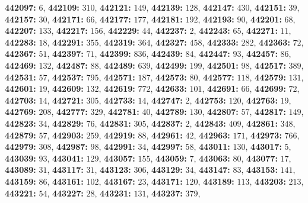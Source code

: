 \textsf{\bfseries 442097:} $6$, \textsf{\bfseries 442109:} $310$, \textsf{\bfseries 442121:} $149$, \textsf{\bfseries 442139:} $128$, \textsf{\bfseries 442147:} $430$, \textsf{\bfseries 442151:} $39$, \textsf{\bfseries 442157:} $30$, \textsf{\bfseries 442171:} $66$, \textsf{\bfseries 442177:} $177$, \textsf{\bfseries 442181:} $192$, \textsf{\bfseries 442193:} $90$, \textsf{\bfseries 442201:} $68$, \textsf{\bfseries 442207:} $133$, \textsf{\bfseries 442217:} $156$, \textsf{\bfseries 442229:} $44$, \textsf{\bfseries 442237:} $2$, \textsf{\bfseries 442243:} $65$, \textsf{\bfseries 442271:} $11$, \textsf{\bfseries 442283:} $18$, \textsf{\bfseries 442291:} $355$, \textsf{\bfseries 442319:} $364$, \textsf{\bfseries 442327:} $458$, \textsf{\bfseries 442333:} $282$, \textsf{\bfseries 442363:} $72$, \textsf{\bfseries 442367:} $51$, \textsf{\bfseries 442397:} $71$, \textsf{\bfseries 442399:} $836$, \textsf{\bfseries 442439:} $84$, \textsf{\bfseries 442447:} $93$, \textsf{\bfseries 442457:} $86$, \textsf{\bfseries 442469:} $132$, \textsf{\bfseries 442487:} $88$, \textsf{\bfseries 442489:} $639$, \textsf{\bfseries 442499:} $199$, \textsf{\bfseries 442501:} $98$, \textsf{\bfseries 442517:} $389$, \textsf{\bfseries 442531:} $57$, \textsf{\bfseries 442537:} $795$, \textsf{\bfseries 442571:} $187$, \textsf{\bfseries 442573:} $80$, \textsf{\bfseries 442577:} $118$, \textsf{\bfseries 442579:} $131$, \textsf{\bfseries 442601:} $19$, \textsf{\bfseries 442609:} $132$, \textsf{\bfseries 442619:} $772$, \textsf{\bfseries 442633:} $101$, \textsf{\bfseries 442691:} $66$, \textsf{\bfseries 442699:} $72$, \textsf{\bfseries 442703:} $14$, \textsf{\bfseries 442721:} $305$, \textsf{\bfseries 442733:} $14$, \textsf{\bfseries 442747:} $2$, \textsf{\bfseries 442753:} $120$, \textsf{\bfseries 442763:} $19$, \textsf{\bfseries 442769:} $208$, \textsf{\bfseries 442777:} $329$, \textsf{\bfseries 442781:} $40$, \textsf{\bfseries 442789:} $130$, \textsf{\bfseries 442807:} $57$, \textsf{\bfseries 442817:} $149$, \textsf{\bfseries 442823:} $34$, \textsf{\bfseries 442829:} $76$, \textsf{\bfseries 442831:} $305$, \textsf{\bfseries 442837:} $2$, \textsf{\bfseries 442843:} $409$, \textsf{\bfseries 442861:} $348$, \textsf{\bfseries 442879:} $57$, \textsf{\bfseries 442903:} $259$, \textsf{\bfseries 442919:} $88$, \textsf{\bfseries 442961:} $42$, \textsf{\bfseries 442963:} $171$, \textsf{\bfseries 442973:} $766$, \textsf{\bfseries 442979:} $308$, \textsf{\bfseries 442987:} $98$, \textsf{\bfseries 442991:} $34$, \textsf{\bfseries 442997:} $58$, \textsf{\bfseries 443011:} $130$, \textsf{\bfseries 443017:} $5$, \textsf{\bfseries 443039:} $93$, \textsf{\bfseries 443041:} $129$, \textsf{\bfseries 443057:} $155$, \textsf{\bfseries 443059:} $7$, \textsf{\bfseries 443063:} $80$, \textsf{\bfseries 443077:} $17$, \textsf{\bfseries 443089:} $31$, \textsf{\bfseries 443117:} $31$, \textsf{\bfseries 443123:} $306$, \textsf{\bfseries 443129:} $34$, \textsf{\bfseries 443147:} $83$, \textsf{\bfseries 443153:} $141$, \textsf{\bfseries 443159:} $86$, \textsf{\bfseries 443161:} $102$, \textsf{\bfseries 443167:} $23$, \textsf{\bfseries 443171:} $120$, \textsf{\bfseries 443189:} $113$, \textsf{\bfseries 443203:} $213$, \textsf{\bfseries 443221:} $54$, \textsf{\bfseries 443227:} $28$, \textsf{\bfseries 443231:} $131$, \textsf{\bfseries 443237:} $379$, 
